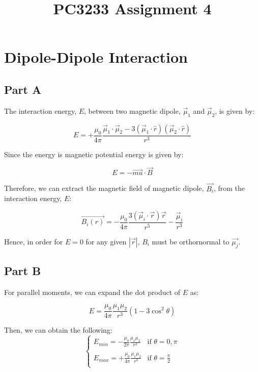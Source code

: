 \documentclass[11pt]{article}
\title{PC3233 Assignment 4}
\begin{document}
    
    \maketitle
    
    \section{Dipole-Dipole Interaction}
    \subsection{Part A}

    The interaction energy, $E$, between two magnetic dipole, $\vec{\mu}_1$ and $\vec{\mu}_2$, is given by:

    \begin{equation}
      E = + \frac{\mu_0}{4\pi} \frac{\vec{\mu}_1 \cdot \vec{\mu}_2 - 3(\vec{\mu}_1 \cdot \hat{r})(\vec{\mu}_2 \cdot \hat{r})}{r^3}
    \end{equation}

    Since the energy is magnetic potential energy is given by:

    \begin{equation}
      E = - \vec{mu} \cdot \vec{B}
    \end{equation}

    Therefore, we can extract the magnetic field of magnetic dipole, $\vec{B_i}$, from the interaction energy, $E$:

    \begin{equation}
      \vec{B_i(r)} = - \frac{\mu_0}{4\pi} \frac{3(\vec{\mu}_i \cdot \vec{r})\vec{r}}{r^5} - \frac{\vec{\mu}_i}{r^3}
    \end{equation}

    Hence, in order for $E = 0$ for any given $|\vec{r}|$, $B_i$ must be orthornormal to $\vec{\mu_j}$.

  \subsection{Part B}

  For parallel moments, we can expand the dot product of $E$ as:

  \begin{equation}
    E = \frac{\mu_0}{4\pi} \frac{\mu_1 \mu_2}{r^3} (1 - 3 \cos^2 \theta)
  \end{equation}

  Then, we can obtain the following:
  \begin{equation}
    \begin{cases}
      \displaystyle
      E_{min} = -\frac{\mu_0}{2\pi} \frac{\mu_1 \mu_2}{r^3} & \text{if } \theta = 0, \pi \\
      \\
      \displaystyle
      E_{max} = +\frac{\mu_0}{4\pi} \frac{\mu_1 \mu_2}{r^3} & \text{if } \theta = \frac{\pi}{2}\\
    \end{cases}
  \end{equation}
\end{document}
